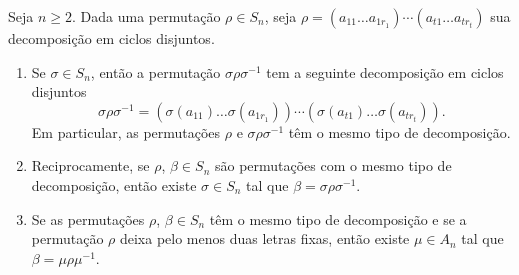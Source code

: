\begin{lema}\label{ciclos_conjugados}
	Seja $n \ge 2$. Dada uma permuta\c{c}\~ao $\rho \in S_n$, seja $\rho = (a_{11}\dots a_{1r_1})\cdots (a_{t1}\dots a_{tr_t})$ sua decomposi\c{c}\~ao em ciclos disjuntos.
	\begin{enumerate}[label=({\roman*})]
		\item Se $\sigma \in S_n$, ent\~ao a permuta\c{c}\~ao $\sigma\rho\sigma^{-1}$ tem a seguinte decomposi\c{c}\~ao em ciclos disjuntos
		\[
			\sigma\rho\sigma^{-1} = (\sigma(a_{11})\dots \sigma(a_{1r_1}))\cdots (\sigma(a_{t1})\dots \sigma(a_{tr_t})).
		\]
		Em particular, as permuta\c{c}\~oes $\rho$ e $\sigma\rho\sigma^{-1}$ t\^em o mesmo tipo de decomposi\c{c}\~ao.

		\item Reciprocamente, se $\rho$, $\beta \in S_n$ s\~ao permuta\c{c}\~oes com o mesmo tipo de decomposi\c{c}\~ao, ent\~ao existe $\sigma \in S_n$ tal que $\beta = \sigma\rho\sigma^{-1}$.

		\item Se as permuta\c{c}\~oes $\rho$, $\beta \in S_n$ t\^em o mesmo tipo de decomposi\c{c}\~ao e se a permuta\c{c}\~ao $\rho$ deixa pelo menos duas letras fixas, ent\~ao existe $\mu \in A_n$ tal que $\beta = \mu\rho\mu^{-1}$.
	\end{enumerate}
\end{lema}
